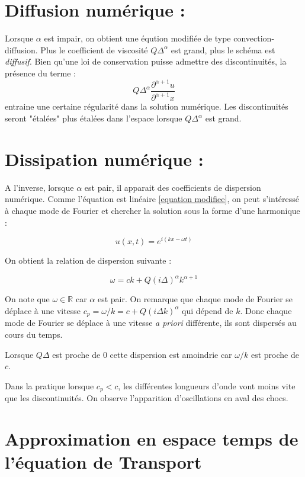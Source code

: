 \documentclass[10pt,a4paper]{amsart}
\begin{document}
\section{Diffusion numérique : }

Lorsque $\alpha$ est impair, on obtient une éqution modifiée de type convection-diffusion. Plus le coefficient de viscosité $Q \Delta^{\alpha}$ est grand, plus le schéma est \textit{diffusif}. Bien qu'une loi de conservation puisse admettre des discontinuités, la présence du terme :
$$Q \Delta^\alpha \dfrac{\partial^{\alpha + 1} u}{\partial^{\alpha + 1} x}$$
 entraine une certaine régularité dans la solution numérique. Les discontinuités seront "étalées" plus étalées dans l'espace lorsque $Q \Delta^{\alpha}$ est grand.
\newline


\section{Dissipation numérique : }

A l'inverse, lorsque $\alpha$ est pair, il apparait des coefficients de dispersion numérique. Comme l'équation est linéaire \eqref{equation modifiee}, on peut s'intéressé à chaque mode de Fourier et chercher la solution sous la forme d'une harmonique :

$$u(x,t)= e^{i(kx - \omega t)}$$

On obtient la relation de dispersion suivante :

\begin{equation}
\omega = ck + Q \left( i \Delta \right)^{\alpha} k^{\alpha +1}
\end{equation}

On note que $\omega \in \mathbb{R}$ car $\alpha$ est pair. On remarque que chaque mode de Fourier se déplace à une vitesse $c_p = \omega / k = c + Q \left( i \Delta k \right)^{\alpha}$ qui dépend de $k$. Donc chaque mode de Fourier se déplace à une vitesse \textit{a priori} différente, ils sont dispersés au cours du temps.

Lorsque $Q \Delta$ est proche de $0$ cette dispersion est amoindrie car $\omega / k$ est proche de $c$.

Dans la pratique lorsque $c_p < c$, les différentes longueurs d'onde vont moins vite que les discontinuités. On observe l'apparition d'oscillations en aval des chocs.

\section{Approximation en espace temps de l'équation de Transport}
\end{document}
